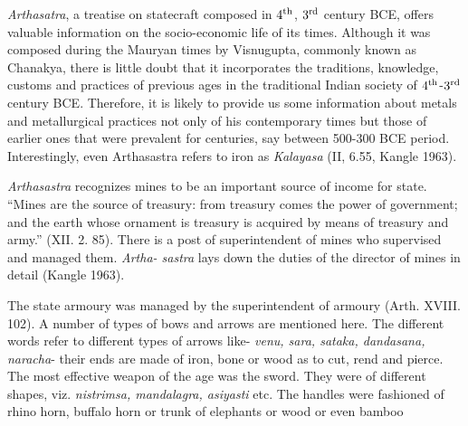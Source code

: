 

{\it Arthasatra}, a treatise on statecraft composed in $4^{\rm th}$, $3^{\rm rd}$ century BCE, offers valuable information on the socio-economic life of its times. Although it was composed during the Mauryan times by Visnugupta, commonly known as Chanakya, there is little doubt that it incorporates the traditions, knowledge, customs and practices of previous ages in the traditional Indian society of $4^{\rm th}$-$3^{\rm rd}$ century BCE. Therefore, it is likely to provide us some information about metals and metallurgical practices not only of his contemporary times but those of earlier ones that were prevalent for centuries, say between 500-300 BCE period. Interestingly, even Arthasastra refers to iron as {\it Kalayasa} (II, 6.55, Kangle 1963).

{\it Arthasastra} recognizes mines to be an important source of income for state. “Mines are the source of treasury: from treasury comes the power of government; and the earth whose ornament is treasury is acquired by means of treasury and army.” (XII. 2. 85). There is a post of superintendent of mines who supervised and managed them. {\it Artha- sastra} lays down the duties of the director of mines in detail (Kangle 1963).

The state armoury was managed by the superintendent of armoury (Arth. XVIII. 102). A number of types of bows and arrows are mentioned here. The different words refer to different types of arrows like- {\it venu, sara, sataka, dandasana, naracha}- their ends are made of iron, bone or wood as to cut, rend and pierce. The most effective weapon of the age was the sword. They were of different shapes, viz. {\it nistrimsa, mandalagra, asiyasti} etc. The handles were fashioned of rhino horn, buffalo horn or trunk of elephants or wood or even bamboo

